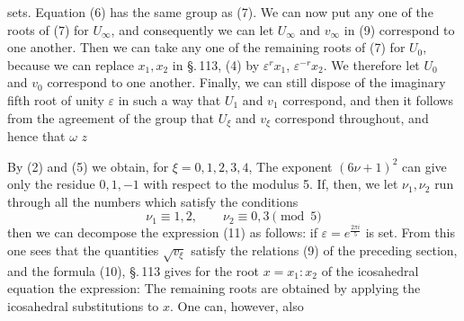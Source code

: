 sets. Equation (6) has the same  group as (7). We can now put any one of the roots of (7) for $U_\infty$, and consequently we can let $U_\infty$ and $v_\infty$ in (9) correspond to one another. Then we can take any one of the remaining roots of (7) for $U_0$, because we can replace $x_1, x_2$ in \S.\,113, (4) by $\varepsilon^r x_1$, $\varepsilon^{-r} x_2$. We therefore let $U_0$ and $v_0$ correspond to one another. Finally, we can still dispose of the imaginary fifth root of unity $\varepsilon$ in such a way that $U_1$ and $v_1$ correspond, and then it follows from the agreement of the group that $U_\xi$ and $v_\xi$ correspond throughout, and hence that
 $\omega$  $z$ 

By (2) and (5) we obtain, for $\xi = 0, 1, 2, 3, 4$,
The exponent $(6\nu+1)^2$ can give only the residue $0, 1, -1$ with respect to the modulus 5. If, then, we let $\nu_1, \nu_2$ run through all the numbers which satisfy the conditions
\[
\nu_1 \equiv 1, 2, \qquad \nu_2 \equiv 0, 3 \pmod{5}
\]
then we can decompose the expression (11) as follows:
if $\varepsilon = e^{\frac{2\pi i}{5}}$ is set. From this one sees that the quantities $\sqrt{v_\xi}$ satisfy the relations (9) of the preceding section, and the formula (10), \S.\,113 gives for the root $x = x_1 : x_2$ of the icosahedral equation the expression:
The remaining roots are obtained by applying the icosahedral substitutions to $x$. One can, however, also

